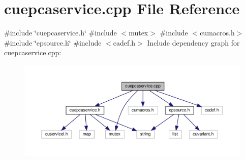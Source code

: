 \section{cuepcaservice.\+cpp File Reference}
\label{cuepcaservice_8cpp}
{\ttfamily \#include \char`\"{}cuepcaservice.\+h\char`\"{}}\newline
{\ttfamily \#include $<$mutex$>$}\newline
{\ttfamily \#include $<$cumacros.\+h$>$}\newline
{\ttfamily \#include \char`\"{}epsource.\+h\char`\"{}}\newline
{\ttfamily \#include $<$cadef.\+h$>$}\newline
Include dependency graph for cuepcaservice.\+cpp\+:\nopagebreak
\begin{figure}[H]
\begin{center}
\leavevmode
\includegraphics[width=350pt]{cuepcaservice_8cpp__incl}
\end{center}
\end{figure}
